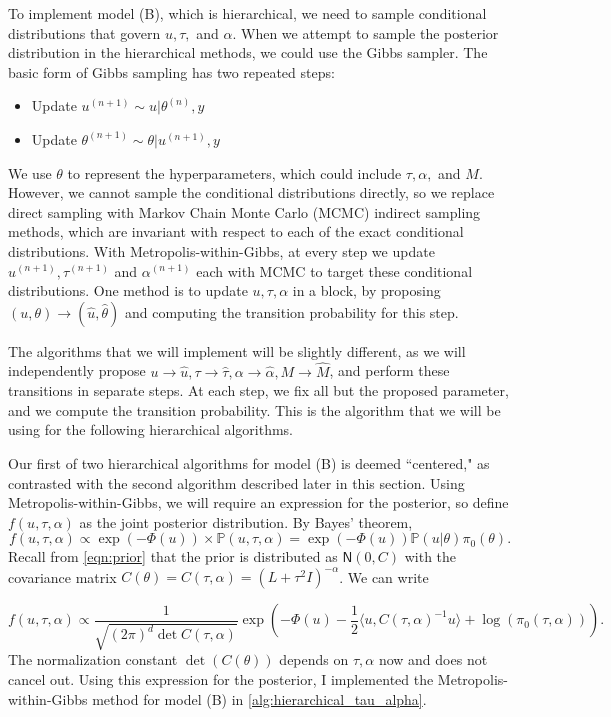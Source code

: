 \documentclass{siamart1116}
\begin{document}
To implement model (B), which is hierarchical, we need to sample conditional distributions that govern $u, \tau,$ and $\alpha$. When we attempt to sample the posterior distribution in the hierarchical methods, we could use the Gibbs sampler. The basic form of Gibbs sampling has two repeated steps:
\begin{itemize}
\item Update $u^{(n+1)} \sim u|\theta^{(n)}, y$
\item Update $\theta^{(n+1)} \sim \theta|u^{(n+1)}, y$
\end{itemize}
We use $\theta$ to represent the hyperparameters, which could include $\tau, \alpha,$ and $M$. However, we cannot sample the conditional distributions directly, so we replace direct sampling with Markov Chain Monte Carlo (MCMC) indirect sampling methods, which are invariant with respect to each of the exact conditional distributions. With Metropolis-within-Gibbs, at every step we update $u^{(n+1)}, \tau^{(n+1)}$ and $\alpha^{(n+1)}$ each with MCMC to target these conditional distributions. One method is to update $u, \tau, \alpha$ in a block, by proposing $(u,\theta) \to  (\hat u, \hat \theta)$ and computing the transition probability for this step. 

The algorithms that we will implement will be slightly different, as we will independently propose $u \to \hat u, \tau \to \hat \tau, \alpha \to \hat \alpha, M \to \hat M$, and perform these transitions in separate steps. At each step, we fix all but the proposed parameter, and we compute the transition probability. This is the algorithm that we will be using for the following hierarchical algorithms.

Our first of two hierarchical algorithms for model (B) is deemed ``centered," as contrasted with the second algorithm described later in this section. Using Metropolis-within-Gibbs, we will require an expression for the posterior, so define $f(u,\tau,\alpha)$ as the joint posterior distribution. By Bayes' theorem, 
\[f(u,\tau,\alpha) \propto \exp(-\Phi(u))\times\mathbb{P}(u,\tau,\alpha) = \exp(-\Phi(u))\mathbb{P}(u|\theta)\pi_0(\theta).\]
Recall from \cref{eqn:prior} that the prior is distributed as $\mathsf{N}(0, C)$ with the covariance matrix $C(\theta) = C(\tau, \alpha) = (L + \tau^2I)^{-\alpha}$. We can write

\begin{equation}
\label{eqn:centered_post}
f(u,\tau,\alpha) \propto 
\frac{1}{\sqrt{(2\pi)^d \det C(\tau,\alpha)}} \exp\left(-\Phi(u)-\frac{1}{2}\langle u, C(\tau,\alpha)^{-1}u  \rangle + \log(\pi_0(\tau,\alpha)) \right).
\end{equation}
The normalization constant $\det(C(\theta))$ depends on $\tau, \alpha$ now and does not cancel out. Using this expression for the posterior, I implemented the Metropolis-within-Gibbs method for model (B) in \cref{alg:hierarchical_tau_alpha}.
\end{document}
